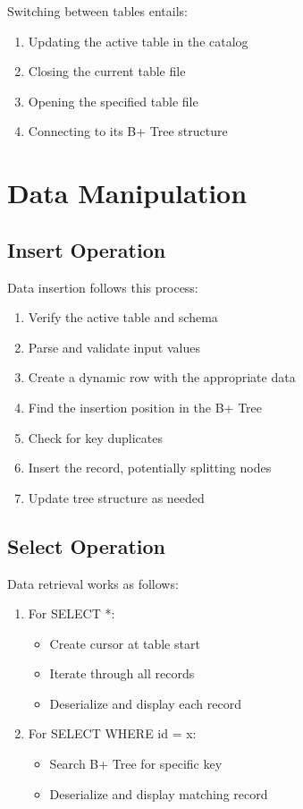 \documentclass[12pt,a4paper]{article}  %
\begin{document}
Switching between tables entails:

\begin{enumerate}
    \item Updating the active table in the catalog
    \item Closing the current table file
    \item Opening the specified table file
    \item Connecting to its B+ Tree structure
\end{enumerate}

\section{Data Manipulation}

\subsection{Insert Operation}
Data insertion follows this process:

\begin{enumerate}
    \item Verify the active table and schema
    \item Parse and validate input values
    \item Create a dynamic row with the appropriate data
    \item Find the insertion position in the B+ Tree
    \item Check for key duplicates
    \item Insert the record, potentially splitting nodes
    \item Update tree structure as needed
\end{enumerate}

\subsection{Select Operation}
Data retrieval works as follows:

\begin{enumerate}
    \item For SELECT *:
        \begin{itemize}
            \item Create cursor at table start
            \item Iterate through all records
            \item Deserialize and display each record
        \end{itemize}
    \item For SELECT WHERE id = x:
        \begin{itemize}
            \item Search B+ Tree for specific key
            \item Deserialize and display matching record
        \end{itemize}
\end{enumerate}
\end{document}
